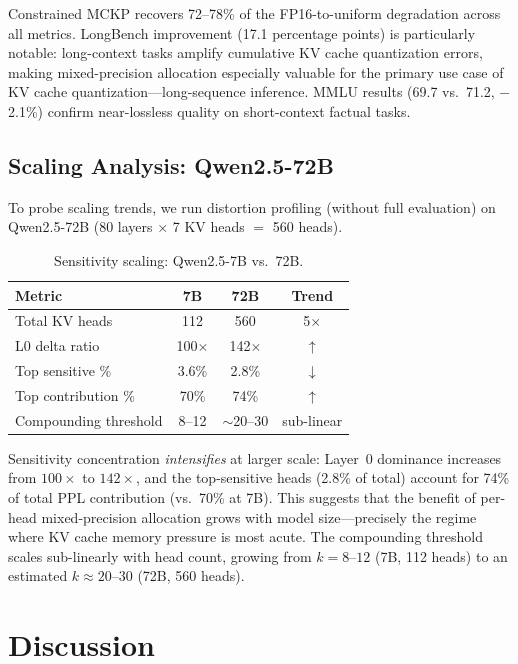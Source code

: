 \documentclass[11pt,a4paper]{article}
\begin{document}
Constrained MCKP recovers 72--78\% of the FP16-to-uniform degradation across all metrics.
LongBench improvement (17.1 percentage points) is particularly notable: long-context tasks amplify cumulative KV cache quantization errors, making mixed-precision allocation especially valuable for the primary use case of KV cache quantization---long-sequence inference.
MMLU results (69.7 vs.\ 71.2, $-$2.1\%) confirm near-lossless quality on short-context factual tasks.

\subsection{Scaling Analysis: Qwen2.5-72B}

To probe scaling trends, we run distortion profiling (without full evaluation) on Qwen2.5-72B (80 layers $\times$ 7 KV heads $=$ 560 heads).

\begin{table}[t]
\centering
\small
\caption{Sensitivity scaling: Qwen2.5-7B vs.\ 72B.}
\label{tab:scaling}
\begin{tabular}{lccc}
\toprule
\textbf{Metric} & \textbf{7B} & \textbf{72B} & \textbf{Trend} \\
\midrule
Total KV heads & 112 & 560 & 5$\times$ \\
L0 delta ratio & 100$\times$ & 142$\times$ & $\uparrow$ \\
Top sensitive \% & 3.6\% & 2.8\% & $\downarrow$ \\
Top contribution \% & 70\% & 74\% & $\uparrow$ \\
Compounding threshold & 8--12 & $\sim$20--30 & sub-linear \\
\bottomrule
\end{tabular}
\end{table}

Sensitivity concentration \emph{intensifies} at larger scale: Layer~0 dominance increases from $100\times$ to $142\times$, and the top-sensitive heads (2.8\% of total) account for 74\% of total PPL contribution (vs.\ 70\% at 7B).
This suggests that the benefit of per-head mixed-precision allocation grows with model size---precisely the regime where KV cache memory pressure is most acute.
The compounding threshold scales sub-linearly with head count, growing from $k = 8$--$12$ (7B, 112 heads) to an estimated $k \approx 20$--$30$ (72B, 560 heads).

\section{Discussion}
\end{document}
